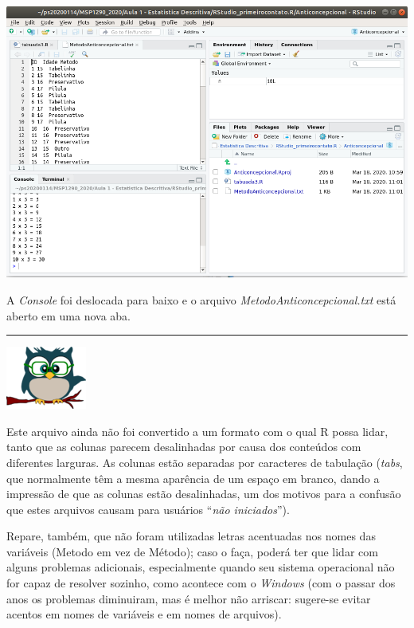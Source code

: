 \documentclass[
]{article}
\begin{document}
\begin{center}\includegraphics[width=0.9\linewidth]{RStudio_tsv} \end{center}

A \emph{Console} foi deslocada para baixo e o arquivo
\emph{MetodoAnticoncepcional.txt} está aberto em uma nova aba.

\begin{center}\rule{0.5\linewidth}{0.5pt}\end{center}

\begin{flushleft}\includegraphics[width=0.08\linewidth]{coruja} \end{flushleft}

Este arquivo ainda não foi convertido a um formato com o qual R possa
lidar, tanto que as colunas parecem desalinhadas por causa dos conteúdos
com diferentes larguras. As colunas estão separadas por caracteres de
tabulação (\emph{tabs}, que normalmente têm a mesma aparência de um
espaço em branco, dando a impressão de que as colunas estão
desalinhadas, um dos motivos para a confusão que estes arquivos causam
para usuários ``\emph{não iniciados}'').

Repare, também, que não foram utilizadas letras acentuadas nos nomes das
variáveis (Metodo em vez de Método); caso o faça, poderá ter que lidar
com alguns problemas adicionais, especialmente quando seu sistema
operacional não for capaz de resolver sozinho, como acontece com o
\emph{Windows} (com o passar dos anos os problemas diminuiram, mas é
melhor não arriscar: sugere-se evitar acentos em nomes de variáveis e em
nomes de arquivos).
\end{document}
